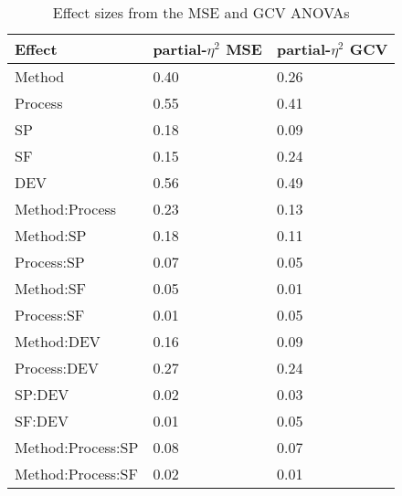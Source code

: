 \documentclass[man, floatsintext]{apa7}
\begin{document}
\begin{table}[tbp] %

  \begin{center}
    \begin{threeparttable}
      \caption{Effect sizes from the MSE and GCV ANOVAs}
      \label{tab:peta}
      \begin{tabular}{lll}
        \toprule
        Effect                & \multicolumn{1}{c}{partial-$\eta^2$ MSE} &
        \multicolumn{1}{c}{partial-$\eta^2$ GCV}
        \\
        \midrule
        Method                & 0.40                                     & 0.26
        \\
        Process               & 0.55                                     & 0.41
        \\
        SP                    & 0.18                                     & 0.09
        \\
        SF                    & 0.15                                     & 0.24
        \\
        DEV                   & 0.56                                     & 0.49
        \\
        Method:Process        & 0.23                                     & 0.13
        \\
        Method:SP             & 0.18                                     & 0.11
        \\
        Process:SP            & 0.07                                     & 0.05
        \\
        Method:SF             & 0.05                                     & 0.01
        \\
        Process:SF            & 0.01                                     & 0.05
        \\
        Method:DEV            & 0.16                                     & 0.09
        \\
        Process:DEV           & 0.27                                     & 0.24
        \\
        SP:DEV                & 0.02                                     & 0.03
        \\
        SF:DEV                & 0.01                                     & 0.05
        \\
        Method:Process:SP     & 0.08                                     & 0.07
        \\
        Method:Process:SF     & 0.02                                     & 0.01

\end{tabular}
\end{threeparttable}
\end{center}
\end{table}
\end{document}
